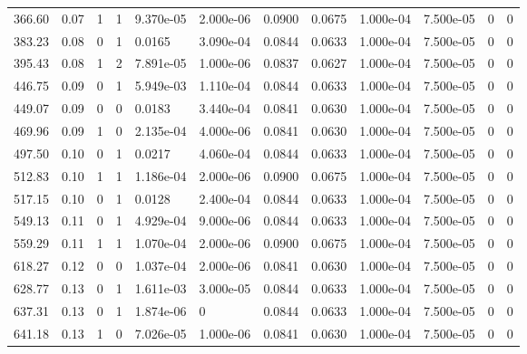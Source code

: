 \documentclass[preview]{standalone}
\begin{document}
{{\begin{tabular}{L{1.2cm}C{1.2cm} C{0.3cm}C{0.5cm} C{1.4cm}C{1.4cm} C{1.4cm}C{1.4cm} C{1.6cm}C{1.6cm} C{1.6cm}C{1.6cm}}
  366.60  &  0.07  & 1     &  1 &  9.370e-05  & 2.000e-06  &  0.0900&   0.0675& 1.000e-04 & 7.500e-05   &  0 & 0  \\ 
  383.23  &  0.08  & 0     &  1 &  0.0165  & 3.090e-04  &  0.0844&   0.0633& 1.000e-04 & 7.500e-05   &  0 & 0  \\ 
  395.43  &  0.08  & 1     &  2 &  7.891e-05  & 1.000e-06  &  0.0837&   0.0627& 1.000e-04 & 7.500e-05   &  0 & 0  \\ 
  446.75  &  0.09  & 0     &  1 &  5.949e-03  & 1.110e-04  &  0.0844&   0.0633& 1.000e-04 & 7.500e-05   &  0 & 0  \\ 
  449.07  &  0.09  & 0     &  0 &  0.0183  & 3.440e-04  &  0.0841&   0.0630& 1.000e-04 & 7.500e-05   &  0 & 0  \\ 
  469.96  &  0.09  & 1     &  0 &  2.135e-04  & 4.000e-06  &  0.0841&   0.0630& 1.000e-04 & 7.500e-05   &  0 & 0  \\ 
  497.50  &  0.10  & 0     &  1 &  0.0217  & 4.060e-04  &  0.0844&   0.0633& 1.000e-04 & 7.500e-05   &  0 & 0  \\ 
  512.83  &  0.10  & 1     &  1 &  1.186e-04  & 2.000e-06  &  0.0900&   0.0675& 1.000e-04 & 7.500e-05   &  0 & 0  \\ 
  517.15  &  0.10  & 0     &  1 &  0.0128  & 2.400e-04  &  0.0844&   0.0633& 1.000e-04 & 7.500e-05   &  0 & 0  \\ 
  549.13  &  0.11  & 0     &  1 &  4.929e-04  & 9.000e-06  &  0.0844&   0.0633& 1.000e-04 & 7.500e-05   &  0 & 0  \\ 
  559.29  &  0.11  & 1     &  1 &  1.070e-04  & 2.000e-06  &  0.0900&   0.0675& 1.000e-04 & 7.500e-05   &  0 & 0  \\ 
  618.27  &  0.12  & 0     &  0 &  1.037e-04  & 2.000e-06  &  0.0841&   0.0630& 1.000e-04 & 7.500e-05   &  0 & 0  \\ 
  628.77  &  0.13  & 0     &  1 &  1.611e-03  & 3.000e-05  &  0.0844&   0.0633& 1.000e-04 & 7.500e-05   &  0 & 0  \\ 
  637.31  &  0.13  & 0     &  1 &  1.874e-06  & 0  &  0.0844&   0.0633& 1.000e-04 & 7.500e-05   &  0 & 0  \\ 
  641.18  &  0.13  & 1     &  0 &  7.026e-05  & 1.000e-06  &  0.0841&   0.0630& 1.000e-04 & 7.500e-05   &  0 & 0  \\ 
\hline 
\end{tabular} 

}}
\end{document}
